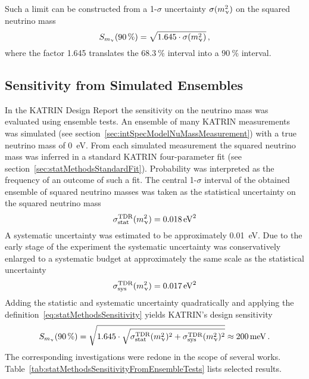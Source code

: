 Such a limit can be constructed from a 1-$\sigma$ uncertainty $\sigma(m_\upnu^2)$ on the squared neutrino mass~\cite{Kleesiek2014,Angrik:2005ep}
\begin{equation}
	\label{eq:statMethodsSensitivity}
	S_{m_\upnu}(\SI{90}{\percent}) = \sqrt{1.645\cdot\sigma(m_\upnu^2)}
	\text{\,,}
\end{equation}
where the factor 1.645 translates the $\SI{68.3}{\percent}$ interval into a $\SI{90}{\percent}$ interval.

\subsection{Sensitivity from Simulated Ensembles}
\label{sec:statMethodsSensitivtyFromEnsemble}
In the KATRIN Design Report the sensitivity on the neutrino mass was evaluated using ensemble tests. An ensemble of many KATRIN measurements was simulated (see section~\ref{sec:intSpecModelNuMassMeasurement}) with a true neutrino mass of \SI{0}{eV}. From each simulated measurement the squared neutrino mass was inferred in a standard KATRIN four-parameter fit (see section~\ref{sec:statMethodsStandardFit}). Probability was interpreted as the frequency of an outcome of such a fit. The central 1-$\sigma$ interval of the obtained ensemble of squared neutrino masses was taken as the statistical uncertainty on the squared neutrino mass~\cite{Angrik:2005ep}
\begin{equation}
	\sigma_\mathrm{stat}^\mathrm{TDR}(m_\upnu^2) = \SI{0.018}{eV^2}
\end{equation}
A systematic uncertainty was estimated to be approximately \SI{0.01}{eV}. Due to the early stage of the experiment the systematic uncertainty was conservatively enlarged to a systematic budget at approximately the same scale as the statistical uncertainty~\cite{Angrik:2005ep}
\begin{equation}
	\sigma_\mathrm{sys}^\mathrm{TDR}(m_\upnu^2) = \SI{0.017}{eV^2}
\end{equation}
Adding the statistic and systematic uncertainty quadratically and applying the definition~\eqref{eq:statMethodsSensitivity} yields KATRIN's design sensitivity~\cite{Angrik:2005ep}
\begin{equation}
	\label{eq:statMethodsSensitivityDesignReport}
	S_{m_\upnu}(\SI{90}{\percent}) = 
	\sqrt{1.645\cdot
		\sqrt{
		\sigma_\mathrm{stat}^\mathrm{TDR}(m_\upnu^2)^2+\sigma_\mathrm{sys}^\mathrm{TDR}(m_\upnu^2)^2
	}}
	\approx \SI{200}{meV}
	\text{\,.}
\end{equation}
The corresponding investigations were redone in the scope of several works. Table~\ref{tab:statMethodsSensitivityFromEnsembleTests} lists selected results.

